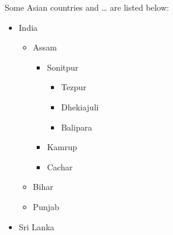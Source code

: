 \documentclass[11pt,a4paper]{article}
\begin{document}
Some Asian countries and … are listed below:
    \begin{itemize}
        \item India
            \begin{itemize}
                \item Assam
                \begin{itemize}
                    \item Sonitpur
                    \begin{itemize}
                        \item Tezpur
                        \item Dhekiajuli
                        \item Balipara
                    \end{itemize}
                    \item Kamrup
                    \item Cachar
                \end{itemize}
                \item Bihar
                \item Punjab
            \end{itemize}
        \item Sri Lanka
    \end{itemize}
\end{document}
